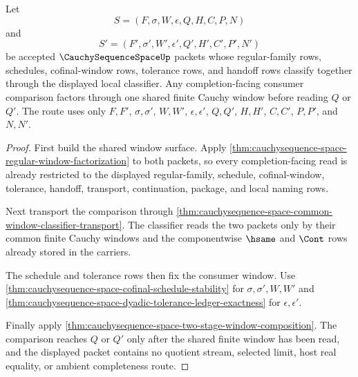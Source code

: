 \begin{theorem}
\label{thm:cauchysequence-space-shared-window-completion-consumer}
Let
$$
S=(F,\sigma,W,\epsilon,Q,H,C,P,N)
$$
and
$$
S'=(F',\sigma',W',\epsilon',Q',H',C',P',N')
$$
be accepted $\CauchySequenceSpaceUp$ packets whose regular-family rows, schedules, cofinal-window rows, tolerance rows, and handoff rows classify together through the displayed local classifier. Any completion-facing consumer comparison factors through one shared finite Cauchy window before reading $Q$ or $Q'$. The route uses only $F,F'$, $\sigma,\sigma'$, $W,W'$, $\epsilon,\epsilon'$, $Q,Q'$, $H,H'$, $C,C'$, $P,P'$, and $N,N'$.
\end{theorem}
\begin{proof}
First build the shared window surface. Apply \autoref{thm:cauchysequence-space-regular-window-factorization} to both packets, so every completion-facing read is already restricted to the displayed regular-family, schedule, cofinal-window, tolerance, handoff, transport, continuation, package, and local naming rows.

Next transport the comparison through \autoref{thm:cauchysequence-space-common-window-classifier-transport}. The classifier reads the two packets only by their common finite Cauchy windows and the componentwise $\hsame$ and $\Cont$ rows already stored in the carriers.

The schedule and tolerance rows then fix the consumer window. Use \autoref{thm:cauchysequence-space-cofinal-schedule-stability} for $\sigma,\sigma',W,W'$ and \autoref{thm:cauchysequence-space-dyadic-tolerance-ledger-exactness} for $\epsilon,\epsilon'$.

Finally apply \autoref{thm:cauchysequence-space-two-stage-window-composition}. The comparison reaches $Q$ or $Q'$ only after the shared finite window has been read, and the displayed packet contains no quotient stream, selected limit, host real equality, or ambient completeness route.
\end{proof}


